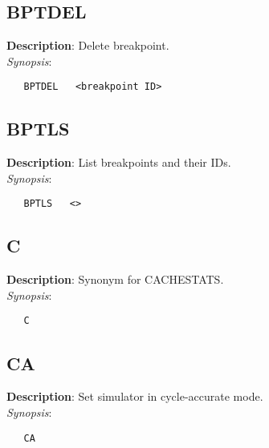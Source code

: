 \subsection{\bf BPTDEL}
\label{manpages:BPTDEL}
\label{manpages:bptdel}
\vspace{-0.2in}
{\bf Description}: 	Delete breakpoint.\\[1.5ex]
{\em Synopsis}:
\vspace{-0.2in}
\scriptsize
\begin{verbatim}
   BPTDEL   <breakpoint ID>	
\end{verbatim}
\normalsize
\vspace{-0.2in}


\subsection{\bf BPTLS}
\label{manpages:BPTLS}
\label{manpages:bptls}
\vspace{-0.2in}
{\bf Description}: 	List breakpoints and their IDs.\\[1.5ex]
{\em Synopsis}:
\vspace{-0.2in}
\scriptsize
\begin{verbatim}
   BPTLS   <>	
\end{verbatim}
\normalsize
\vspace{-0.2in}


\subsection{\bf C}
\label{manpages:C}
\label{manpages:c}
\vspace{-0.2in}
{\bf Description}: 	Synonym for CACHESTATS.\\[1.5ex]
{\em Synopsis}:
\vspace{-0.2in}
\scriptsize
\begin{verbatim}
   C   						
\end{verbatim}
\normalsize
\vspace{-0.2in}


\subsection{\bf CA}
\label{manpages:CA}
\label{manpages:ca}
\vspace{-0.2in}
{\bf Description}: 	Set simulator in cycle-accurate mode.\\[1.5ex]
{\em Synopsis}:
\vspace{-0.2in}
\scriptsize
\begin{verbatim}
   CA   				
\end{verbatim}
\normalsize
\vspace{-0.2in}


